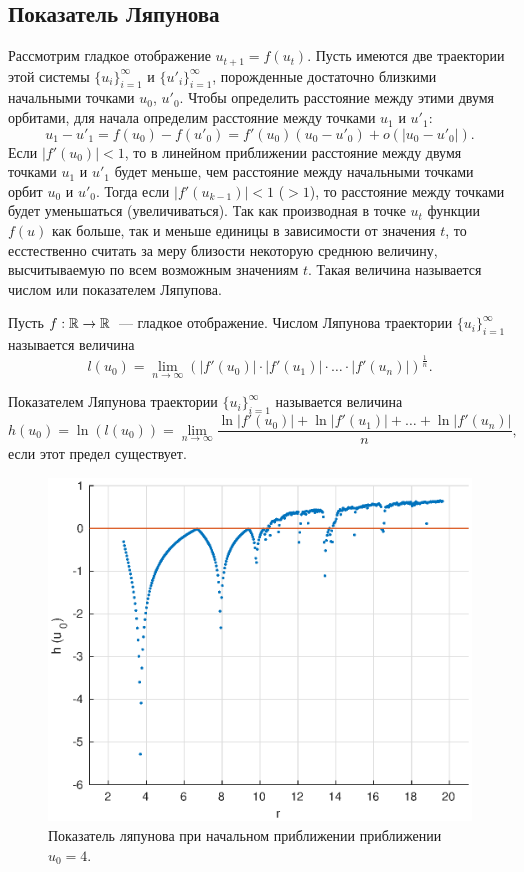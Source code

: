 \subsection{Показатель Ляпунова}

Рассмотрим гладкое отображение $u_{t+1} = f(u_t)$. Пусть имеются две траектории этой системы $\{u_i\}_{i=1}^{\infty}$ и $\{u'_i\}_{i=1}^{\infty}$, порожденные достаточно близкими начальными точками $u_0$, $u'_0$. Чтобы определить расстояние между этими двумя орбитами, для начала определим расстояние между точками $u_1$ и $u'_1$:
$$
        u_1-u'_1 = f(u_0)-f(u'_0) = f'(u_0)(u_0-u'_0)+o(|u_0-u'_0|).
$$
Если $|f'(u_0)| < 1$, то в линейном приближении расстояние между двумя точками $u_1$ и $u'_1$ будет меньше, чем расстояние между начальными точками орбит $u_0$ и $u'_0$. Тогда если $|f'(u_{k-1})| < 1$ ($>1$), то расстояние между точками будет уменьшаться (увеличиваться). Так как производная в точке $u_t$ функции $f(u)$ как больше, так и меньше единицы в зависимости от значения $t$, то есстественно считать за меру близости некоторую среднюю величину, высчитываемую по всем возможным значениям $t$. Такая величина называется числом или показателем Ляпупова. \cite[стр.~93]{bratus10}

\begin{definition}
        Пусть $f:\mathbb{R}\rightarrow\mathbb{R}$~--- гладкое отображение. Числом Ляпунова траектории $\{u_i\}_{i=1}^{\infty}$ называется величина
        $$
                l(u_0) = \lim\limits_{n \to \infty}\left( |f'(u_0)| \cdot |f'(u_1)| \cdot \ldots \cdot |f'(u_n)| \right)^{\frac{1}{n}}.
        $$
        \cite[стр.~94]{bratus10}
\end{definition}
            
\begin{definition}
        Показателем Ляпунова траектории $\{u_i\}_{i=1}^{\infty}$ называется величина
        $$
                h(u_0) = \ln(l(u_0)) = \lim\limits_{n \to \infty} \frac{\ln|f'(u_0)| + \ln|f'(u_1)| + \ldots + \ln|f'(u_n)|}{n},
        $$
        если этот предел существует. \cite[стр.~94]{bratus10}
\end{definition}
            
\begin{figure}[h]
        \centering
        \includegraphics[width=0.6\linewidth]{img/one_step_lyapunov.eps}
        \caption{Показатель ляпунова при начальном приближении приближении $u_0 = 4$.}
        \label{img:one_step_lyapunov}
\end{figure}